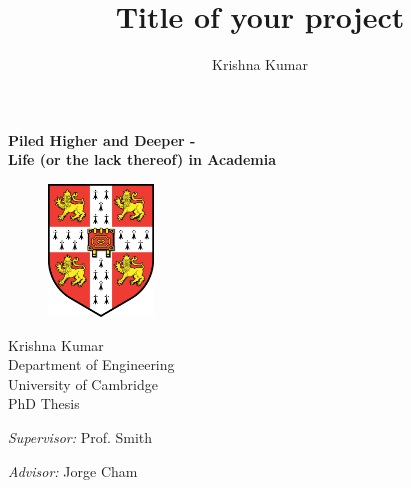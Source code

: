 \documentclass[a4paper,twoside,11pt,fleqn,openright]{book}
\title{Title of your project}
\author{Krishna Kumar}
\begin{document}

\begin{singlespace}

\frontmatter

\begin{titlepage}

\begin{center}

\Huge


\textbf{Piled Higher and Deeper - \\ Life (or the lack thereof) in Academia}

\vspace{1in}

\begin{figure}[ht]
	\centering
		\includegraphics[width=0.25\textwidth]{Cambridge.pdf}
\end{figure}
\vspace{1.2in}
\normalsize

\Large
Krishna Kumar\\

\vspace{0.1in}
\large
Department of Engineering\\
University of Cambridge\\
\vspace{1in}
\large
PhD Thesis\\
\vspace{0.7in}
\begin{minipage}{0.4\textwidth}
\begin{flushleft} \large
\emph{Supervisor:} Prof. Smith\\
\end{flushleft}
\end{minipage}
\begin{minipage}{0.4\textwidth}
\begin{flushright} \large
\emph{Advisor:} Jorge Cham \\
\end{flushright}
\end{minipage}


\end{center}
\end{titlepage}
\end{singlespace}
\end{document}
